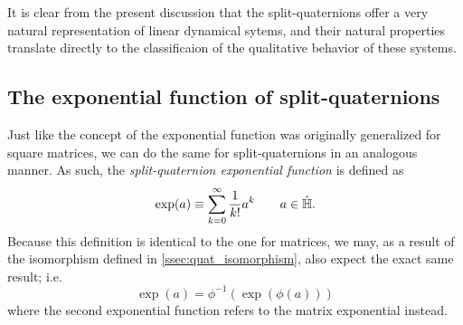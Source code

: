 It is clear from the present discussion that the split-quaternions offer a very natural representation of linear dynamical sytems, and their natural properties translate directly to the classificaion of the qualitative behavior of these systems. 

\subsection{The exponential function of split-quaternions}
Just like the concept of the exponential function was originally generalized for square matrices, we can do the same for split-quaternions in an analogous manner. As such, the \emph{split-quaternion exponential function} is defined as
$$ \exp(a) \equiv \sum_{k=0}^\infty \frac{1}{k!} a^k \qquad a \in \hat{\mathbb{H}}.  $$
Because this definition is identical to the one for matrices, we may, as a result of the isomorphism defined in \cref{ssec:quat_isomorphism}, also expect the exact same result; i.e.
$$ \exp(a) = \phi^{-1}(\exp(\phi(a))) $$
where the second exponential function refers to the matrix exponential instead.

